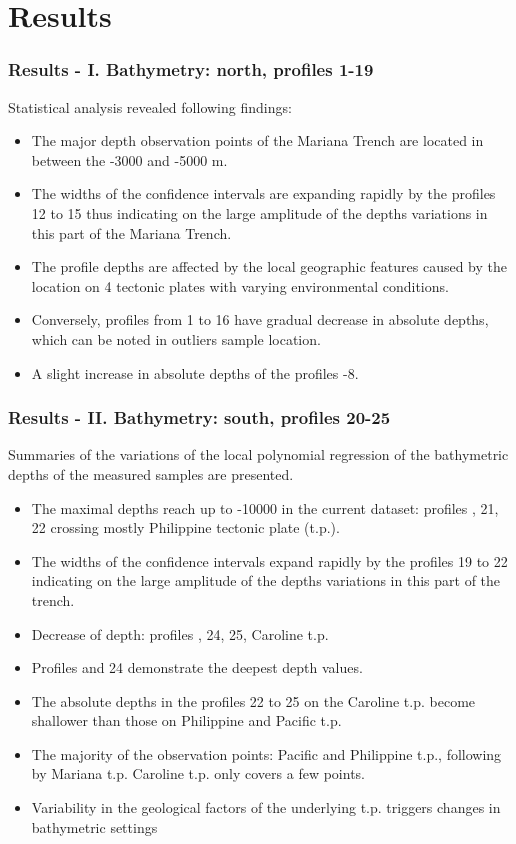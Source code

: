 \documentclass[pdflatex,compress,8pt,
	xcolor={dvipsnames,dvipsnames,svgnames,x11names,table},
	hyperref={colorlinks = true,breaklinks = true, urlcolor = NavyBlue, breaklinks = true}]{beamer}
\begin{document}

\section{Results}
\begin{frame}\frametitle{Results - I. Bathymetry: north, profiles 1-19}
Statistical analysis revealed following findings:
\begin{itemize}
    \item The major depth observation points of the Mariana Trench are located in between the -3000 and -5000 m.
    \item The widths of the confidence intervals are expanding rapidly by the profiles 12 to 15 thus indicating on the large amplitude of the depths variations in this part of the Mariana Trench.
    \item The profile depths are affected by the local geographic features caused by the location on 4 tectonic plates with varying environmental conditions.
    \item Conversely, profiles from 1 to 16 have gradual decrease in absolute depths, which can be noted in outliers sample location. 
    \item A slight increase in absolute depths of the profiles \textnumero {}-8. 
\end{itemize}
\end{frame}
	
\begin{frame}\frametitle{Results - II. Bathymetry: south, profiles 20-25}
Summaries of the variations of the local polynomial regression of the bathymetric depths of the measured samples are presented. \begin{itemize}
    \item The maximal depths reach up to -10000 in the current dataset: profiles , 21, 22 crossing mostly Philippine tectonic plate (t.p.).
    \item The widths of the confidence intervals expand rapidly by the profiles 19 to 22 indicating on the large amplitude of the depths variations in this part of the trench.
    \item Decrease of depth: profiles , 24, 25, Caroline t.p.
    \item Profiles  and 24 demonstrate the deepest depth values. 
    \item The absolute depths in the profiles 22 to 25 on the Caroline t.p. become shallower than those on Philippine and Pacific t.p.
    \item The majority of the observation points: Pacific and Philippine t.p., following by Mariana t.p. Caroline t.p. only covers a few points. 
    \item Variability in the geological factors of the underlying t.p. triggers changes in bathymetric settings
\end{itemize}
\end{frame}	
\end{document}
